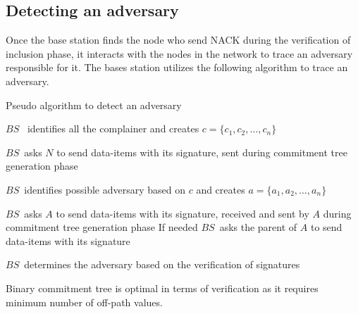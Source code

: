 	\subsection{Detecting an adversary}
		Once the base station finds the node who send NACK during the verification of inclusion phase, it interacts with the nodes in the network to trace an adversary responsible for it. 
		The bases station utilizes the following algorithm to trace an adversary.

		\begin{algorithm}
		\caption{Pseudo algorithm to detect an adversary}
		\label{algo:detect-an-adversary}

			\begin{algorithmic}[1]

					\STATE $BS$ \ identifies all the complainer and creates $c = \{c_{1}, c_{2}, \dotsc, c_{n}\}$

						\STATE $BS$\ asks $N$ to send data-items with its signature, sent during commitment tree generation phase
					
					\ENDFOR

					\STATE $BS$\ identifies possible adversary based on $c$ and creates $a = \{a_{1},a_{2},\dotsc,a_{n}\}$


						\STATE $BS$\ asks $A$ to send data-items with its signature, received and sent by $A$ during commitment tree generation phase
						\STATE If needed $BS$\  asks the parent of $A$ to send data-items with its signature
			
					\ENDFOR

					\STATE $BS$\ determines the adversary based on the verification of signatures

			\end{algorithmic}
		\end{algorithm}

	\begin{theorem}
		\label{Commitment tree}
		Binary commitment tree is optimal in terms of verification as it requires minimum number of off-path values.
	\end{theorem}

